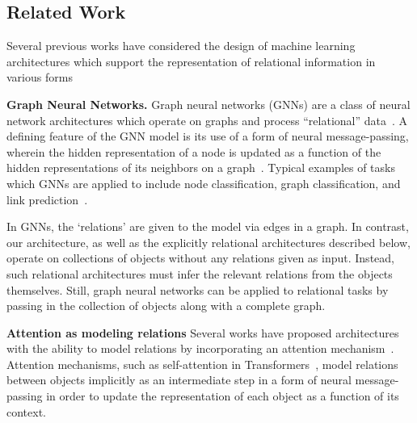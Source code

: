\subsection{Related Work}

Several previous works have considered the design of machine learning architectures which support the representation of relational information in various forms~\citep{battagliaRelationalInductiveBiases2018}%

\textbf{Graph Neural Networks.} Graph neural networks (GNNs) are a class of neural network architectures which operate on graphs and process ``relational'' data~\citep{niepertLearningConvolutionalNeural2016,kipfSemiSupervisedClassificationGraph2017,schlichtkrullModelingRelationalData2017,velickovicGraphAttentionNetworks2017,kipfNeuralRelationalInference2018,xuHowPowerfulAre2018}. A defining feature of the GNN model is its use of a form of neural message-passing, wherein the hidden representation of a node is updated as a function of the hidden representations of its neighbors on a graph~\citep{gilmerNeuralMessagePassing2017}. Typical examples of tasks which GNNs are applied to include node classification, graph classification, and link prediction~\citep{hamiltonGraphRepresentationLearning2020}. %

In GNNs, the `relations' are given to the model via edges in a graph. In contrast, our architecture, as well as the explicitly relational architectures described below, operate on collections of objects without any relations given as input. Instead, such relational architectures must infer the relevant relations from the objects themselves. Still, graph neural networks can be applied to relational tasks by passing in the collection of objects along with a complete graph. %

\textbf{Attention as modeling relations} Several works have proposed architectures with the ability to model relations by incorporating an attention mechanism~\citep{vaswani2017attention,locatelloObjectCentricLearningSlot2020,santoroRelationalRecurrent2018,zambaldiDeepReinforcementLearning2018,velickovicGraphAttentionNetworks2017}. Attention mechanisms, such as self-attention in Transformers~\citep{vaswani2017attention}, model relations between objects implicitly as an intermediate step in a form of neural message-passing in order to update the representation of each object as a function of its context.


